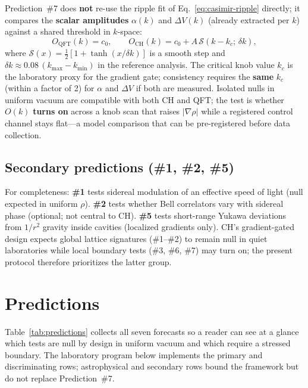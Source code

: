 \documentclass[11pt,a4paper]{article}
\begin{document}
Prediction~\#7 does \textbf{not} re-use the ripple fit of Eq.~\ref{eq:casimir-ripple} directly; it compares the \textbf{scalar amplitudes} $\alpha(k)$ and $\Delta V(k)$ (already extracted per $k$) against a shared threshold in $k$-space:
\begin{equation}
  O_{\mathrm{QFT}}(k) = c_0, \qquad
  O_{\mathrm{CH}}(k) = c_0 + A\,\mathcal{S}(k - k_c;\,\delta k),
  \label{eq:threshold-fit}
\end{equation}
where $\mathcal{S}(x) = \tfrac{1}{2}[1 + \tanh(x/\delta k)]$ is a smooth step and $\delta k \approx 0.08\,(k_{\max}-k_{\min})$ in the reference analysis.
The critical knob value $k_c$ is the laboratory proxy for the gradient gate; consistency requires the \textbf{same} $k_c$ (within a factor of 2) for $\alpha$ and $\Delta V$ if both are measured.
Isolated nulls in uniform vacuum are compatible with both CH and QFT; the test is whether $O(k)$ \textbf{turns on} across a knob scan that raises $|\nabla\rho|$ while a registered control channel stays flat---a model comparison that can be pre-registered before data collection.

\subsection{Secondary predictions (\#1, \#2, \#5)}

For completeness: \textbf{\#1} tests sidereal modulation of an effective speed of light (null expected in uniform $\rho$).
\textbf{\#2} tests whether Bell correlators vary with sidereal phase (optional; not central to CH).
\textbf{\#5} tests short-range Yukawa deviations from $1/r^2$ gravity inside cavities (localized gradients only).
CH's gradient-gated design expects global lattice signatures (\#1--\#2) to remain null in quiet laboratories while local boundary tests (\#3, \#6, \#7) may turn on; the present protocol therefore prioritizes the latter group.

\section{Predictions}
\label{sec:predictions}

Table~\ref{tab:predictions} collects all seven forecasts so a reader can see at a glance which tests are null by design in uniform vacuum and which require a stressed boundary.
The laboratory program below implements the primary and discriminating rows; astrophysical and secondary rows bound the framework but do not replace Prediction~\#7.
\end{document}
